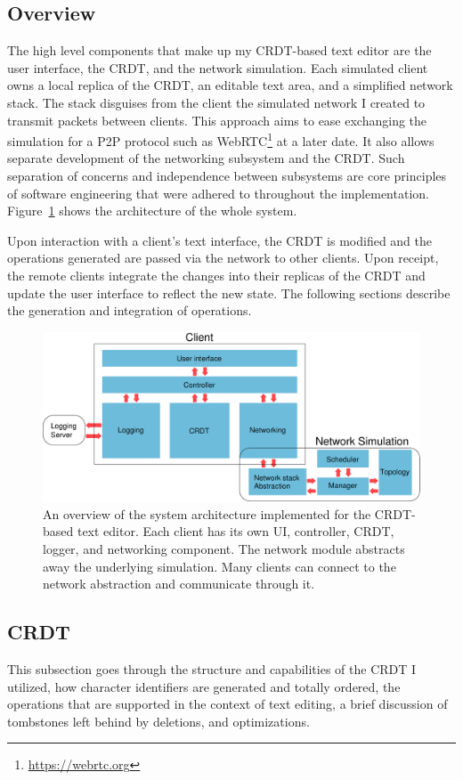 \documentclass[12pt,a4paper,twoside,openright]{report}
\begin{document}
	\subsection{Overview}
	The high level components that make up my CRDT-based text editor are the user interface, the CRDT, and the network simulation. Each simulated client owns a local replica of the CRDT, an editable text area, and a simplified network stack. The stack disguises from the client the simulated network I created to transmit packets between clients. This approach aims to ease exchanging the simulation for a P2P protocol such as WebRTC\footnote{\url{https://webrtc.org}} at a later date. It also allows separate development of the networking subsystem and the CRDT. Such separation of concerns and independence between subsystems are core principles of software engineering that were adhered to throughout the implementation. Figure~\ref{fig:sysarch} shows the architecture of the whole system. 
	
	Upon interaction with a client's text interface, the CRDT is modified and the operations generated are passed via the network to other clients. Upon receipt, the remote clients integrate the changes into their replicas of the CRDT and update the user interface to reflect the new state. The following sections describe the generation and integration of operations.
	
	\begin{figure}[H]
		\centering
		\includegraphics[width=1\linewidth]{figs/sysarch.eps}
		\caption[System Architecture]{An overview of the system architecture implemented for the CRDT-based text editor. Each client has its own UI, controller, CRDT, logger, and networking component. The network module abstracts away the underlying simulation. Many clients can connect to the network abstraction and communicate through it.}
		\label{fig:sysarch}
	\end{figure}
	
	
	\subsection{CRDT}
		This subsection goes through the structure and capabilities of the CRDT I utilized, how character identifiers are generated and totally ordered, the operations that are supported in the context of text editing, a brief discussion of tombstones left behind by deletions, and optimizations.
		
\end{document}
